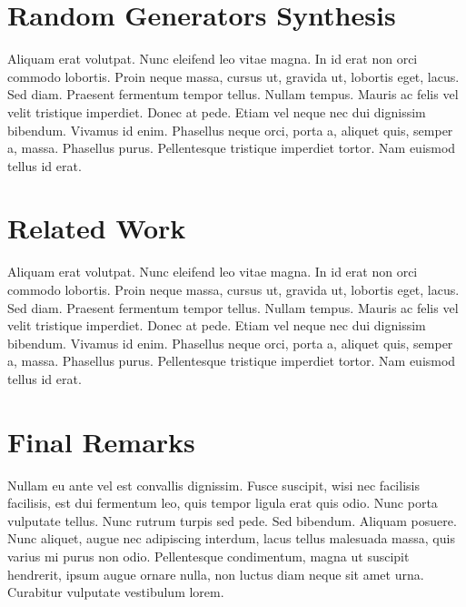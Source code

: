 \documentclass[conference, fleqn]{IEEEtran}
\begin{document}

\section{Random Generators Synthesis} \label{sec:synthesis}

Aliquam erat volutpat. Nunc eleifend leo vitae magna. In id erat non orci
commodo lobortis. Proin neque massa, cursus ut, gravida ut, lobortis eget,
lacus. Sed diam. Praesent fermentum tempor tellus. Nullam tempus. Mauris ac
felis vel velit tristique imperdiet. Donec at pede. Etiam vel neque nec dui
dignissim bibendum. Vivamus id enim. Phasellus neque orci, porta a, aliquet
quis, semper a, massa. Phasellus purus. Pellentesque tristique imperdiet tortor.
Nam euismod tellus id erat.
\section{Related Work}

Aliquam erat volutpat. Nunc eleifend leo vitae magna. In id erat non orci
commodo lobortis. Proin neque massa, cursus ut, gravida ut, lobortis eget,
lacus. Sed diam. Praesent fermentum tempor tellus. Nullam tempus. Mauris ac
felis vel velit tristique imperdiet. Donec at pede. Etiam vel neque nec dui
dignissim bibendum. Vivamus id enim. Phasellus neque orci, porta a, aliquet
quis, semper a, massa. Phasellus purus. Pellentesque tristique imperdiet tortor.
Nam euismod tellus id erat.
\section{Final Remarks}

Nullam eu ante vel est convallis dignissim. Fusce suscipit, wisi nec facilisis
facilisis, est dui fermentum leo, quis tempor ligula erat quis odio. Nunc porta
vulputate tellus. Nunc rutrum turpis sed pede. Sed bibendum. Aliquam posuere.
Nunc aliquet, augue nec adipiscing interdum, lacus tellus malesuada massa, quis
varius mi purus non odio. Pellentesque condimentum, magna ut suscipit hendrerit,
ipsum augue ornare nulla, non luctus diam neque sit amet urna. Curabitur
vulputate vestibulum lorem.



\end{document}
